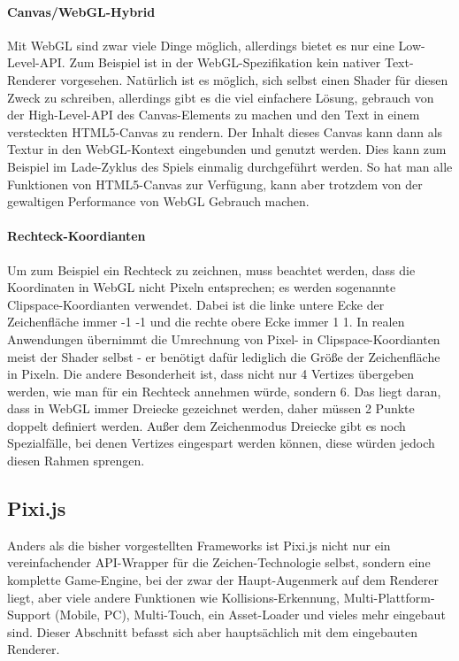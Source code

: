 \documentclass[a4paper, 12pt]{article}
\begin{document}
\paragraph{Canvas/WebGL-Hybrid} Mit WebGL sind zwar viele Dinge möglich, allerdings bietet es nur eine Low-Level-API. Zum Beispiel ist in der WebGL-Spezifikation kein nativer Text-Renderer vorgesehen. Natürlich ist es möglich, sich selbst einen Shader für diesen Zweck zu schreiben, allerdings gibt es die viel einfachere Lösung, gebrauch von der High-Level-API des Canvas-Elements zu machen und den Text in einem versteckten HTML5-Canvas zu rendern. Der Inhalt dieses Canvas kann dann als Textur in den WebGL-Kontext eingebunden und genutzt werden. Dies kann zum Beispiel im Lade-Zyklus des Spiels einmalig durchgeführt werden. So hat man alle Funktionen von HTML5-Canvas zur Verfügung, kann aber trotzdem von der gewaltigen Performance von WebGL Gebrauch machen.
\paragraph{Rechteck-Koordianten} Um zum Beispiel ein Rechteck zu zeichnen, muss beachtet werden, dass die Koordinaten in WebGL nicht Pixeln entsprechen; es werden sogenannte Clipspace-Koordianten verwendet. Dabei ist die linke untere Ecke der Zeichenfläche immer -1 -1 und die rechte obere Ecke immer 1 1. In realen Anwendungen übernimmt die Umrechnung von Pixel- in Clipspace-Koordianten meist der Shader selbst - er benötigt dafür lediglich die Größe der Zeichenfläche in Pixeln. Die andere Besonderheit ist, dass nicht nur 4 Vertizes übergeben werden, wie man für ein Rechteck annehmen würde, sondern 6. Das liegt daran, dass in WebGL immer Dreiecke gezeichnet werden, daher müssen 2 Punkte doppelt definiert werden. Außer dem Zeichenmodus Dreiecke gibt es noch Spezialfälle, bei denen Vertizes eingespart werden können, diese würden jedoch diesen Rahmen sprengen.
\newpage
\subsection{Pixi.js} Anders als die bisher vorgestellten Frameworks ist Pixi.js nicht nur ein vereinfachender API-Wrapper für die Zeichen-Technologie selbst, sondern eine komplette Game-Engine, bei der zwar der Haupt-Augenmerk auf dem Renderer liegt, aber viele andere Funktionen wie Kollisions-Erkennung, Multi-Plattform-Support (Mobile, PC), Multi-Touch, ein Asset-Loader und vieles mehr eingebaut sind. Dieser Abschnitt befasst sich aber hauptsächlich mit dem eingebauten Renderer.
\end{document}

